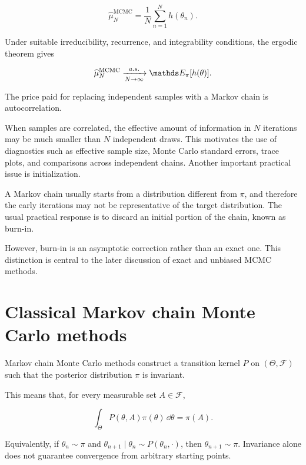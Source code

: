 \begin{equation}
    \widehat{\mu}_N^{\operatorname{MCMC}}
    =
    \frac{1}{N}\sum_{n=1}^{N} h(\theta_n).
    \label{eq:mcmc-estimator-background}
\end{equation}

Under suitable irreducibility, recurrence, and integrability conditions, the ergodic theorem gives \cite{robert2004, meyn2009, polasek2012}

\begin{equation}
    \widehat{\mu}_N^{\operatorname{MCMC}}
    \xrightarrow[N\to\infty]{a.s.}
    \bE_{\pi}\qty[h(\theta)].
    \label{eq:mcmc-ergodic-theorem-background}
\end{equation}

The price paid for replacing independent samples with a Markov chain is autocorrelation.

When samples are correlated, the effective amount of information in $N$ iterations may be much smaller than $N$ independent draws.
This motivates the use of diagnostics such as effective sample size, Monte Carlo standard errors, trace plots, and comparisons across independent chains.
Another important practical issue is initialization.

A Markov chain usually starts from a distribution different from $\pi$, and therefore the early iterations may not be representative of the target distribution.
The usual practical response is to discard an initial portion of the chain, known as burn-in.

However, burn-in is an asymptotic correction rather than an exact one.
This distinction is central to the later discussion of exact and unbiased MCMC methods.

\section{Classical Markov chain Monte Carlo methods}

Markov chain Monte Carlo methods construct a transition kernel $P$ on $(\Theta,\mathcal{F})$ such that the posterior distribution $\pi$ is invariant.

This means that, for every measurable set $A\in\mathcal{F}$,

\begin{equation}
    \int_{\Theta} P(\theta,A)\pi(\theta)\,\dd\theta
    =
    \pi(A).
    \label{eq:invariance-background}
\end{equation}

Equivalently, if $\theta_n\sim\pi$ and $\theta_{n+1}\mid\theta_n\sim P(\theta_n,\cdot)$, then $\theta_{n+1}\sim\pi$.
Invariance alone does not guarantee convergence from arbitrary starting points.

